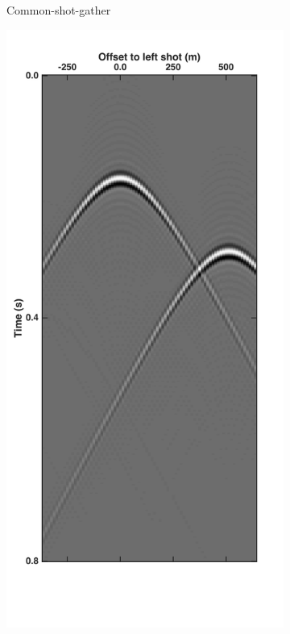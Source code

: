 \begin{figure}
\begin{subfigure}[t]{0.25\textwidth}
		\caption{Common-shot-gather}
		\label{fig:Ch-Theory-PseudoDeblendedCSG2}
	\end{subfigure}
	\centering
	\begin{subfigure}[t]{0.25\textwidth}
		\includegraphics[width=\textwidth]{Plots/Mahdad/30iter/Pseudo-DeblendedCSG_sh1}	

\end{subfigure}
\end{figure}
